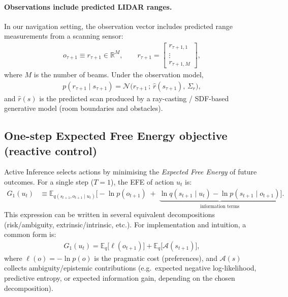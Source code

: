 \documentclass[a4paper, twoside]{article}
\begin{document}
\paragraph{Observations include predicted LIDAR ranges.}
In our navigation setting, the observation vector includes predicted range measurements from a scanning sensor:
\begin{align}
o_{\tau+1} \equiv r_{\tau+1} \in \mathbb{R}^M,
\qquad
r_{\tau+1} =
\begin{bmatrix}
r_{\tau+1,1}\\ \vdots \\ r_{\tau+1,M}
\end{bmatrix},
\end{align}
where $M$ is the number of beams. Under the observation model,
\begin{align}
p(r_{\tau+1}\mid s_{\tau+1})
=
\mathcal{N}\!\big(r_{\tau+1}\,;\,\hat r(s_{\tau+1}),\,\Sigma_r\big),
\label{eq:range_likelihood}
\end{align}
and $\hat r(s)$ is the predicted scan produced by a ray-casting / SDF-based generative model (room boundaries and obstacles).

\subsection{One-step Expected Free Energy objective (reactive control)}
\label{sec:52_one_step}

Active Inference selects actions by minimising the \emph{Expected Free Energy} of future outcomes. For a single step ($T=1$), the EFE of action $u_t$ is:
\begin{align}
G_1(u_t)
&\equiv
\mathbb{E}_{q(s_{t+1},o_{t+1}\mid u_t)}
\Big[
-\ln p(o_{t+1})
\;+\;
\underbrace{\ln q(s_{t+1}\mid u_t) - \ln p(s_{t+1}\mid o_{t+1})}_{\text{information terms}}
\Big].
\label{eq:efe_one_step_general}
\end{align}
This expression can be written in several equivalent decompositions (risk/ambiguity, extrinsic/intrinsic, etc.). For implementation and intuition, a common form is:
\begin{align}
G_1(u_t)
=
\mathbb{E}_{q}
\Big[
\ell(o_{t+1})
\Big]
+
\mathbb{E}_{q}
\Big[
\mathcal{A}(s_{t+1})
\Big],
\label{eq:efe_one_step_decomp}
\end{align}
where $\ell(o)=-\ln p(o)$ is the pragmatic cost (preferences), and $\mathcal{A}(s)$ collects ambiguity/epistemic contributions (e.g.\ expected negative log-likelihood, predictive entropy, or expected information gain, depending on the chosen decomposition).
\end{document}
